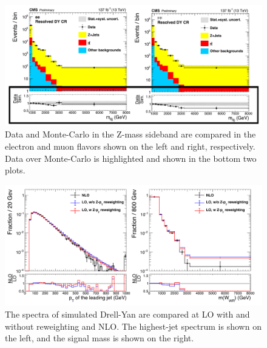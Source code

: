\begin{figure}[!tp]

  \includegraphics[width=\textwidth]{figures/DYCR_wrmass.pdf}

  \caption[Drell-Yan Data vs Monte-Carlo]{
    Data and Monte-Carlo in the Z-mass sideband are compared in the electron and muon flavors shown on the left and right, respectively. Data over Monte-Carlo is highlighted and shown in the bottom two plots.
  }
  \label{fig:LO_Z_vs_data}
\end{figure}

\begin{figure}[!tp]

  \includegraphics[width=\textwidth]{figures/DYCR_NLOvLO.pdf}

  \caption[Drell-Yan LO versus NLO spectra]{
    The spectra of simulated Drell-Yan are compared at LO with and without reweighting and NLO. The highest-\pt jet spectrum is shown on the left, and the signal mass is shown on the right.
  }
  \label{fig:DYCR_NLOvLO}
\end{figure}

